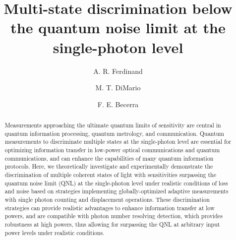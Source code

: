 \documentclass[twocolumn,pra,preprintnumbers,amsmath,amssymb,superscriptaddress,floatfix]{revtex4}%
\begin{document}
\title{Multi-state discrimination below the quantum noise limit at the single-photon level}

\author{A. R. Ferdinand}


\author{M. T. DiMario}


\author{F. E. Becerra}


%

\begin{abstract}


Measurements approaching the ultimate quantum limits of sensitivity
are central in quantum information processing, quantum metrology, and
communication. Quantum measurements to discriminate multiple states
at the single-photon level are essential for optimizing information
transfer in low-power optical communications and quantum
communications, and can enhance the capabilities of many quantum
information protocols. Here, we theoretically investigate and
experimentally demonstrate the discrimination of multiple coherent
states of light with sensitivities surpassing the quantum noise
limit (QNL) at the single-photon level under realistic conditions of
loss and noise based on strategies implementing globally-optimized
adaptive measurements with single photon counting and displacement
operations. These discrimination strategies can provide realistic advantages to enhance information transfer at
low powers, and are compatible with
photon number resolving detection, which provides robustness at high
powers, thus allowing for surpassing the QNL at arbitrary input
power levels under realistic conditions.
\end{abstract}

 \maketitle
\end{document}
